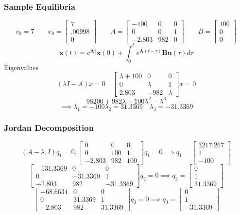 \documentclass{beamer}
\begin{document}
\begin{frame}
\frametitle{Sample Equilibria}
$$
v_0 = 7 \qquad
x_0
=
\begin{bmatrix}
7 \\
.00998 \\
0
\end{bmatrix}
\qquad
A
=
\begin{bmatrix}
-100 & 0 & 0 \\
0 & 0 & 1 \\
-2.803 & 982 & 0
\end{bmatrix}
\qquad
B
=
\begin{bmatrix}
100 \\
0 \\
0
\end{bmatrix}
$$
$$
\mathbf{x}(t)
=
e^{\mathbf{At}}\mathbf{x}(0) + \int_0^t e^{\mathbf{A}(t-\tau)}\mathbf{B}\mathbf{u}(\tau) d\tau
$$
Eigenvalues
$$
(\lambda I - A)x = 0
\quad
\begin{bmatrix}
\lambda + 100 & 0 & 0 \\
0 & \lambda & 1 \\
2.803 & -982 & \lambda
\end{bmatrix}
x = 0
$$
$$
98200 + 982 \lambda - 100 \lambda^2 - \lambda^3
$$
$$
\implies \lambda_1 = -100 \lambda_2 = 31.3369 \quad \lambda_3 = -31.3369
$$
\end{frame}

\begin{frame}
\frametitle{Jordan Decomposition}
$$
(A-\lambda_1 I)q_1=0,
\begin{bmatrix}
0 & 0 & 0 \\
0 & 100 & 1 \\
-2.803 & 982 & 100
\end{bmatrix}
q_1
=
0
\implies
q_1 = \begin{bmatrix} 3217.267 \\ 1 \\ -100 \end{bmatrix}
$$
$$
\begin{bmatrix}
-131.3369 & 0 & 0 \\
0 & -31.3369 & 1 \\
-2.803 & 982 &-31.3369 
\end{bmatrix}
q_2
=0
\implies
q_2 = \begin{bmatrix} 0 \\ 1 \\ 31.3369 \end{bmatrix}
$$
$$
\begin{bmatrix}
-68.6631 & 0 & 0 \\
0 & 31.3369 & 1 \\
-2.803 & 982 & 31.3369
\end{bmatrix}
q_3
=
0
\implies
q_3 = \begin{bmatrix} 0 \\ 1 \\ -31.3369 \end{bmatrix}
$$
\end{frame}
\end{document}
